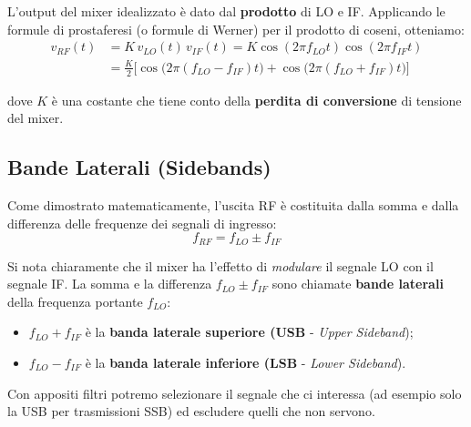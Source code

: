 \documentclass[openany,a4paper,12pt]{book}
\begin{document}
L'output del mixer idealizzato è dato dal \textbf{prodotto} di LO e IF. Applicando le formule di prostaferesi (o formule di Werner) per il prodotto di coseni, otteniamo:
\begin{equation}
    \begin{aligned}
        v_{RF}(t) &= K \, v_{LO}(t) \, v_{IF}(t) = K \cos(2\pi f_{LO}t) \cos(2\pi f_{IF}t) \\[1ex]
        &= \frac{K}{2} \Big[ \cos\big(2\pi (f_{LO} - f_{IF})t\big) + \cos\big(2\pi (f_{LO} + f_{IF})t\big) \Big]
    \end{aligned}
\end{equation}

dove $K$ è una costante che tiene conto della \textbf{perdita di conversione} di tensione del mixer.

\subsection*{Bande Laterali (Sidebands)}

Come dimostrato matematicamente, l'uscita RF è costituita dalla somma e dalla differenza delle frequenze dei segnali di ingresso:
\begin{equation}
    f_{RF} = f_{LO} \pm f_{IF}
\end{equation}

Si nota chiaramente che il mixer ha l'effetto di \textit{modulare} il segnale LO con il segnale IF. La somma e la differenza $f_{LO} \pm f_{IF}$ sono chiamate \textbf{bande laterali} della frequenza portante $f_{LO}$:
\begin{itemize}[label=\textcolor{PoliBlue}{\textbullet}]
    \item $f_{LO} + f_{IF}$ è la \textbf{banda laterale superiore (USB} - \textit{Upper Sideband});
    \item $f_{LO} - f_{IF}$ è la \textbf{banda laterale inferiore (LSB} - \textit{Lower Sideband}).
\end{itemize}

Con appositi filtri potremo selezionare il segnale che ci interessa (ad esempio solo la USB per trasmissioni SSB) ed escludere quelli che non servono.
\end{document}
